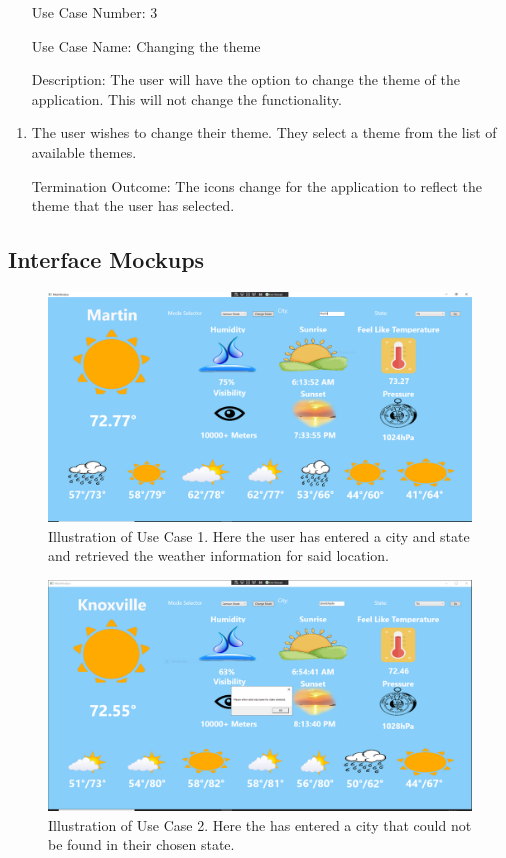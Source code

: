 \documentclass[10pt,conference,onecolumn,compsoc]{IEEEtran}
\begin{document}
\begin{itemize}
\item[Use Case Number:] 3
\item[Use Case Name:] Changing the theme
\item[Description:] The user will have the option to change the theme of the application. This will not change the functionality.
\end{itemize}

\begin{enumerate}
\item The user wishes to change their theme. They select a theme from the list of available themes.
\item[Termination Outcome:] The icons change for the application to reflect the theme that the user has selected. 
\end{enumerate}

\subsection{Interface Mockups}
\begin{figure}[H]
\includegraphics[scale=0.3]{use_case_1.png}
\caption{Illustration of Use Case 1. Here the user has entered a city and state and retrieved the weather information for said location.}
\label{use_case_1}
\end{figure}

\begin{figure}[H]
\includegraphics[scale=0.3]{use_case_2.png}
\caption{Illustration of Use Case 2. Here the has entered a city that could not be found in their chosen state.}
\label{use_case_2}
\end{figure}
\end{document}
